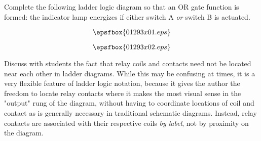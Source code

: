 

Complete the following ladder logic diagram so that an OR gate function is formed: the indicator lamp energizes if either switch A {\it or} switch B is actuated.

$$\epsfbox{01293x01.eps}$$

\vskip 20pt







$$\epsfbox{01293x02.eps}$$







Discuss with students the fact that relay coils and contacts need not be located near each other in ladder diagrams.  While this may be confusing at times, it is a very flexible feature of ladder logic notation, because it gives the author the freedom to locate relay contacts where it makes the most visual sense in the "output" rung of the diagram, without having to coordinate locations of coil and contact as is generally necessary in traditional schematic diagrams.  Instead, relay contacts are associated with their respective coils {\it by label}, not by proximity on the diagram.




